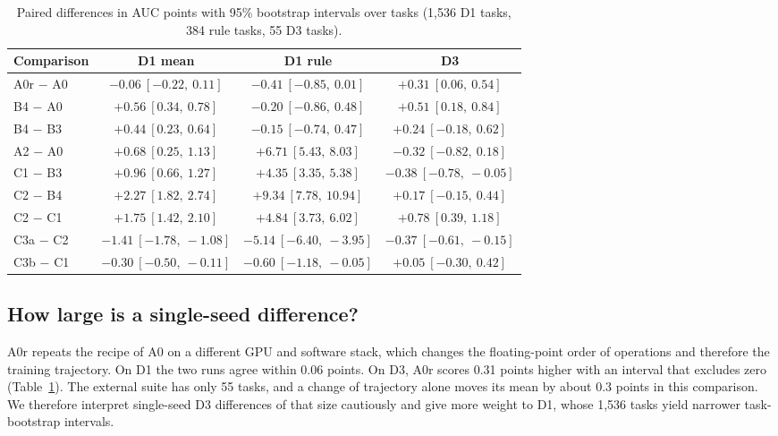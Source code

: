 \documentclass[11pt]{article}
\begin{document}
\begin{table}[t]
\centering
\small
\begin{tabular}{lccc}
\toprule
Comparison & D1 mean & D1 rule & D3 \\
\midrule
A0r $-$ A0 & $-0.06\ [-0.22,\ 0.11]$ & $-0.41\ [-0.85,\ 0.01]$ & $+0.31\ [0.06,\ 0.54]$ \\
B4 $-$ A0 & $+0.56\ [0.34,\ 0.78]$ & $-0.20\ [-0.86,\ 0.48]$ & $+0.51\ [0.18,\ 0.84]$ \\
B4 $-$ B3 & $+0.44\ [0.23,\ 0.64]$ & $-0.15\ [-0.74,\ 0.47]$ & $+0.24\ [-0.18,\ 0.62]$ \\
A2 $-$ A0 & $+0.68\ [0.25,\ 1.13]$ & $+6.71\ [5.43,\ 8.03]$ & $-0.32\ [-0.82,\ 0.18]$ \\
C1 $-$ B3 & $+0.96\ [0.66,\ 1.27]$ & $+4.35\ [3.35,\ 5.38]$ & $-0.38\ [-0.78,\ -0.05]$ \\
C2 $-$ B4 & $+2.27\ [1.82,\ 2.74]$ & $+9.34\ [7.78,\ 10.94]$ & $+0.17\ [-0.15,\ 0.44]$ \\
C2 $-$ C1 & $+1.75\ [1.42,\ 2.10]$ & $+4.84\ [3.73,\ 6.02]$ & $+0.78\ [0.39,\ 1.18]$ \\
C3a $-$ C2 & $-1.41\ [-1.78,\ -1.08]$ & $-5.14\ [-6.40,\ -3.95]$ & $-0.37\ [-0.61,\ -0.15]$ \\
C3b $-$ C1 & $-0.30\ [-0.50,\ -0.11]$ & $-0.60\ [-1.18,\ -0.05]$ & $+0.05\ [-0.30,\ 0.42]$ \\
\bottomrule
\end{tabular}
\caption{Paired differences in AUC points with 95\% bootstrap intervals over tasks (1,536 D1 tasks,
384 rule tasks, 55 D3 tasks).}
\label{tab:paired}
\end{table}

\subsection{How large is a single-seed difference?}
\label{sec:anchor}
A0r repeats the recipe of A0 on a different GPU and software stack, which changes the floating-point
order of operations and therefore the training trajectory. On D1 the two runs agree within
0.06 points. On D3, A0r scores 0.31 points higher with an interval that excludes zero
(Table~\ref{tab:paired}). The external suite has only 55 tasks, and a change of trajectory alone moves
its mean by about 0.3 points in this comparison. We therefore interpret single-seed D3 differences of that
size cautiously and give more weight to D1, whose 1,536 tasks yield narrower task-bootstrap intervals.
\end{document}
